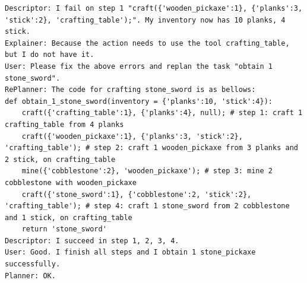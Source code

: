 \begin{lstlisting}
Descriptor: I fail on step 1 "craft({'wooden_pickaxe':1}, {'planks':3, 'stick':2}, 'crafting_table');". My inventory now has 10 planks, 4 stick.
Explainer: Because the action needs to use the tool crafting_table, but I do not have it.
User: Please fix the above errors and replan the task "obtain 1 stone_sword".
RePlanner: The code for crafting stone_sword is as bellows:
def obtain_1_stone_sword(inventory = {'planks':10, 'stick':4}):
    craft({'crafting_table':1}, {'planks':4}, null); # step 1: craft 1 crafting_table from 4 planks 
    craft({'wooden_pickaxe':1}, {'planks':3, 'stick':2}, 'crafting_table'); # step 2: craft 1 wooden_pickaxe from 3 planks and 2 stick, on crafting_table
    mine({'cobblestone':2}, 'wooden_pickaxe'); # step 3: mine 2 cobblestone with wooden_pickaxe
    craft({'stone_sword':1}, {'cobblestone':2, 'stick':2}, 'crafting_table'); # step 4: craft 1 stone_sword from 2 cobblestone and 1 stick, on crafting_table
    return 'stone_sword'
Descriptor: I succeed in step 1, 2, 3, 4. 
User: Good. I finish all steps and I obtain 1 stone_pickaxe successfully.
Planner: OK.

\end{lstlisting}


